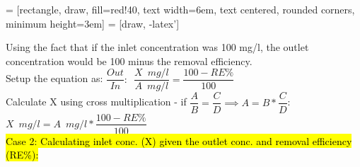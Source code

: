  = [rectangle, draw, fill=red!40, 
    text width=6em, text centered, rounded corners, minimum height=3em]
 = [draw, -latex']
\begin{figure}[!h]
\centering
{}
\end{figure}
Using the fact that if the inlet concentration was 100 mg/l, the outlet concentration would be 100 minus the removal efficiency.\\
Setup the equation as:  $\dfrac{Out}{In}: \enspace \dfrac{X \enspace mg/l}{A \enspace mg/l}=\dfrac{100-RE\%}{100}$\\
Calculate X using cross multiplication - if $\dfrac{A}{B}=\dfrac{C}{D} \implies A=B*\dfrac{C}{D}$:\\
$X \enspace mg/l=A \enspace mg/l*\dfrac{100-RE\%}{100}$\\


\hl{Case 2:  Calculating inlet conc. (X) given the outlet conc. and removal efficiency (RE\%):}

